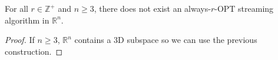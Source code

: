 \begin{corollary}
For all $r \in \mathbb{Z}^+$ and $n \geq 3$, there does not exist an always-$r$-OPT streaming algorithm in $\mathbb{R}^n$.
\end{corollary}

\begin{proof}
If $n \geq 3$, $\mathbb{R}^n$ contains a 3D subspace so we can use the previous construction.
\end{proof}







